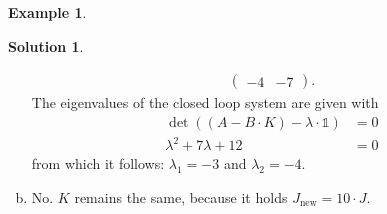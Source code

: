 \documentclass[a4paper,12 pt]{article}
\numberwithin{equation}{section}
\theoremstyle{definition}
\newtheorem{bsp}{Example}
\theoremstyle{remark}
\theoremstyle{definition}
\newtheorem*{lsg}{Solution}
\theoremstyle{definition}
\theoremstyle{definition}
\theoremstyle{remark}
\begin{document}
\begin{bsp}
\begin{lsg}
\begin{enumerate}[(a)]
\begin{equation*}
\begin{split}
\begin{pmatrix}
-4&-7
\end{pmatrix}.
\end{split}
\end{equation*}
The eigenvalues of the closed loop system are given with
\begin{equation*}
\begin{split}
\det((A-B\cdot K)-\lambda \cdot \mathbb{1})&=0\\
\lambda^2+7\lambda +12&=0
\end{split}
\end{equation*}
from which it follows: $\lambda_1=-3$ and $\lambda_2=-4$.
\item No. $K$ remains the same, because it holds $J_{\text{new}}=10\cdot J$. 

\end{enumerate}
\end{lsg}

\end{bsp}
\newpage
\end{document}
